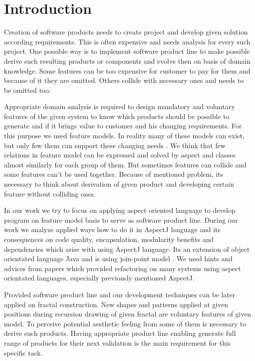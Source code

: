 \documentclass[11pt,english,a4paper,twoside]{article}
\begin{document}
\section{Introduction} \label{introduction}

Creation of software products needs to create project and develop given solution according requirements. This is often expensive and needs analysis for every such project. One possible way is to implement software product line to make possible derive such resulting products or components and evolve then on basis of domain knowledge. Some features can be too expensive for customer to pay for them and because of it they are omitted. Others collide with necessary ones and needs to be omitted too. 

Appropriate domain analysis is required to design mandatory and voluntary features of the given system to know which products should be possible to generate and if it brings value to customer and his changing requirements. For this purpose we used feature models. In reality many of these models can exist, but only few them can support these changing needs \cite{beuche_software_2006}. We think that few relations in feature model can be expressed and solved by aspect and classes almost similarly for each group of them. But sometimes features can collide and some features can't be used together. Because of mentioned problem, its necessary to think about derivation of given product and developing certain feature without colliding ones.  

In our work we try to focus on applying aspect oriented language to develop program on feature model basis to serve as software product line. During our work we analyze applied ways how to do it in AspectJ language and its consequences on code quality, encapsulation, modularity benefits and dependencies which arise with using AspectJ language. Its an extension of object orientated language Java and is using join-point model \cite{hotdraw_deursen_2009}. We used hints and advices from papers which provided refactoring on many systems using aspect orientated languages, especially previously mentioned AspectJ.

Provided software product line and our development techniques can be later applied on fractal construction. New shapes and patterns applied at given positions during recursion drawing of given fractal are voluntary features of given model. To perceive potential aesthetic feeling from some of them is necessary to derive such products. Having appropriate product line enabling generate full range of products for their next validation is the main requirement for this specific task.
\end{document}
